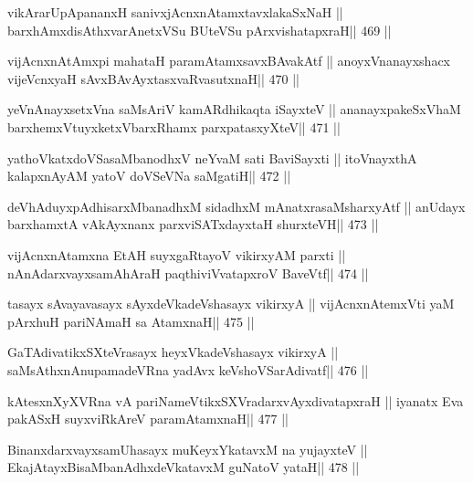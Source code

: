 \begin{shl}
vikArarUpApananxH sanivxjAcnxnAtamxtavxlakaSxNaH ||
barxhAmxdisAthxvarAnetxVSu BUteVSu pArxvishatapxraH\hfill || 469 ||
\end{shl}

\begin{shl}
vijAcnxnAtAmx\s pi mahataH paramAtamxsavxBAvakAtf ||
anoyxV\s nanayxshacx vijeVcnxyaH sAvxBAvAyxtasxvaRvasutxnaH\hfill || 470 ||
\end{shl}

\begin{shl}
yeVnAnayxsetxVna saMsAriV kamARdhikaqta iSayxteV ||
ananayxpakeSxV\s haM barxhemxVtuyxketxVbarxRhamx parxpatasxyXteV\hfill || 471 ||
\end{shl}

\begin{shl}
yathoVkatxdoVSasaMbanodhxV neYvaM sati BaviSayxti ||
itoV\s nayxthA kalapxnAyAM yatoV doVSeVNa saMgatiH\hfill || 472 ||
\end{shl}

\begin{shl}
deVhAduyxpAdhisarxMbanadhxM sidadhxM mAnatxrasaMsharxyAtf ||
anUdayx barxhamxtA vAkAyxnanx parxviSATxdayxtaH shurxteVH\hfill || 473 ||
\end{shl}

\begin{shl}
vijAcnxnAtamxna EtAH suyxgaRtayoV vikirxyAM parxti ||
nAnAdarxvayxsamAhAraH paqthiviVvatapxroV BaveVtf\hfill || 474 ||
\end{shl}

\begin{shl}
tasayx sAvayavasayx sAyxdeVkadeVshasayx vikirxyA ||
vijAcnxnAtemxVti yaM pArxhuH pariNAmaH sa AtamxnaH\hfill || 475 ||
\end{shl}

\begin{shl}
GaTAdivatikxSXteVrasayx heyxVkadeVshasayx vikirxyA ||
saMsAthxnAnupamadeVRna yadAvx keVshoVSarAdivatf\hfill || 476 ||
\end{shl}

\begin{shl}
kAtesxnXyXVRna vA pariNameVtikxSXVradarxvAyxdivatapxraH ||
iyanatx Eva pakASxH suyxviRkAreV paramAtamxnaH\hfill || 477 ||
\end{shl}

\begin{shl}
BinanxdarxvayxsamUhasayx muKeyxYkatavxM na yujayxteV ||
EkajAtayxBisaMbanAdhxdeVkatavxM guNatoV yataH\hfill || 478 ||
\end{shl}

